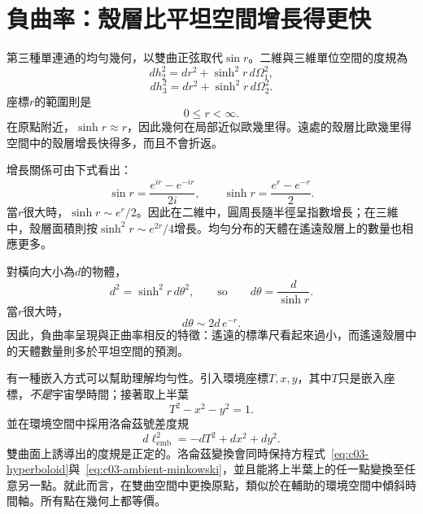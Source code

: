 \section{負曲率：殼層比平坦空間增長得更快}

第三種單連通的均勻幾何，以雙曲正弦取代\(\sin r\)。二維與三維單位空間的度規為
\begin{equation}
dh_2^2 = dr^2 + \sinh^2 r\, d\Omega_1^2,
\label{eq:c03-hyperbolic-two}
\end{equation}
\begin{equation}
dh_3^2 = dr^2 + \sinh^2 r\, d\Omega_2^2.
\label{eq:c03-hyperbolic-three}
\end{equation}
座標\(r\)的範圍則是
\begin{equation}
0\le r<\infty.
\end{equation}
在原點附近，\(\sinh r\approx r\)，因此幾何在局部近似歐幾里得。遠處的殼層比歐幾里得空間中的殼層增長快得多，而且不會折返。

增長關係可由下式看出：
\begin{equation}
\sin r = \frac{e^{ir}-e^{-ir}}{2i},
\qquad
\sinh r = \frac{e^r-e^{-r}}{2}.
\label{eq:c03-sin-sinh}
\end{equation}
當\(r\)很大時，\(\sinh r\sim e^r/2\)。因此在二維中，圓周長隨半徑呈指數增長；在三維中，殼層面積則按\(\sinh^2r\sim e^{2r}/4\)增長。均勻分布的天體在遙遠殼層上的數量也相應更多。

對橫向大小為\(d\)的物體，
\begin{equation}
d^2 = \sinh^2 r\, d\theta^2,
\qquad\text{so}\qquad
d\theta = \frac{d}{\sinh r}.
\label{eq:c03-hyperbolic-angle}
\end{equation}
當\(r\)很大時，
\begin{equation}
d\theta \sim 2d\,e^{-r}.
\end{equation}
因此，負曲率呈現與正曲率相反的特徵：遙遠的標準尺看起來過小，而遙遠殼層中的天體數量則多於平坦空間的預測。

\begin{classroomqa}
\end{classroomqa}

有一種嵌入方式可以幫助理解均勻性。引入環境座標\(T,x,y\)，其中\(T\)只是嵌入座標，\emph{不是}宇宙學時間；接著取上半葉
\begin{equation}
T^2 - x^2 - y^2 = 1.
\label{eq:c03-hyperboloid}
\end{equation}
並在環境空間中採用洛侖茲號差度規
\begin{equation}
d\ell_{\mathrm{emb}}^2=-dT^2+dx^2+dy^2.
\label{eq:c03-ambient-minkowski}
\end{equation}
雙曲面上誘導出的度規是正定的。洛侖茲變換會同時保持方程式~\eqref{eq:c03-hyperboloid}與~\eqref{eq:c03-ambient-minkowski}\allowbreak，並且能將上半葉上的任一點變換至任意另一點。就此而言，在雙曲空間中更換原點，類似於在輔助的環境空間中傾斜時間軸。所有點在幾何上都等價。

